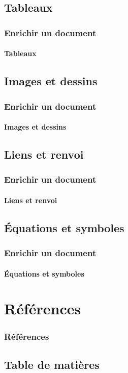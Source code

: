 \documentclass[xcolor=table]{beamer}
\begin{document}
\subsection{Tableaux}

\begin{frame}
\frametitle{Enrichir un document}
\framesubtitle{Tableaux}

\end{frame}

\subsection{Images et dessins}

\begin{frame}
\frametitle{Enrichir un document}
\framesubtitle{Images et dessins}

\end{frame}

\subsection{Liens et renvoi}

\begin{frame}
\frametitle{Enrichir un document}
\framesubtitle{Liens et renvoi}

\end{frame}

\subsection{Équations et symboles}

\begin{frame}
\frametitle{Enrichir un document}
\framesubtitle{Équations et symboles}

\end{frame}

\section{Références}

\begin{frame}
\frametitle{Références}

\end{frame}

\subsection{Table de matières}
\end{document}
